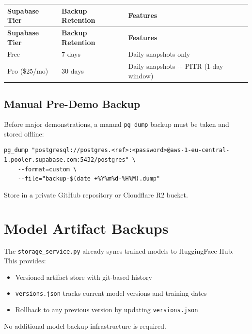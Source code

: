 \documentclass[12pt,a4paper]{report}
\begin{document}
\begin{longtable}{L{3.5cm} L{3.5cm} L{5cm}}
    \toprule
    \textbf{Supabase Tier} & \textbf{Backup Retention} & \textbf{Features} \\
    \midrule
    \endfirsthead
    \toprule
    \textbf{Supabase Tier} & \textbf{Backup Retention} & \textbf{Features} \\
    \midrule
    \endhead
    \bottomrule
    \endlastfoot

    Free & 7 days & Daily snapshots only \\[4pt]
    Pro (\$25/mo) & 30 days & Daily snapshots + PITR (1-day window) \\

\end{longtable}

\subsection{Manual Pre-Demo Backup}

Before major demonstrations, a manual \texttt{pg\_dump} backup must
be taken and stored offline:

\begin{lstlisting}[caption={Manual database backup command}]
pg_dump "postgresql://postgres.<ref>:<password>@aws-1-eu-central-1.pooler.supabase.com:5432/postgres" \
    --format=custom \
    --file="backup-$(date +%Y%m%d-%H%M).dump"
\end{lstlisting}

Store in a private GitHub repository or Cloudflare R2 bucket.

\section{Model Artifact Backups}

The \texttt{storage\_service.py} already syncs trained models to
HuggingFace Hub. This provides:

\begin{itemize}[leftmargin=1.5em]
    \item Versioned artifact store with git-based history
    \item \texttt{versions.json} tracks current model versions and
          training dates
    \item Rollback to any previous version by updating \texttt{versions.json}
\end{itemize}

No additional model backup infrastructure is required.
\end{document}

